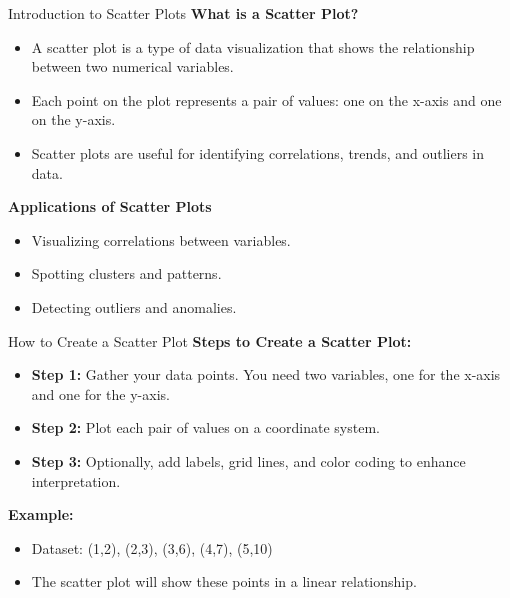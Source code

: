 \documentclass[handout]{beamer} %
\begin{document}
\begin{frame}{Introduction to Scatter Plots}
    \textbf{What is a Scatter Plot?}
    \begin{itemize}
        \item A scatter plot is a type of data visualization that shows the relationship between two numerical variables.
        \item Each point on the plot represents a pair of values: one on the x-axis and one on the y-axis.
        \item Scatter plots are useful for identifying correlations, trends, and outliers in data.
    \end{itemize}

    \textbf{Applications of Scatter Plots}
    \begin{itemize}
        \item Visualizing correlations between variables.
        \item Spotting clusters and patterns.
        \item Detecting outliers and anomalies.
    \end{itemize}
\end{frame}

\begin{frame}{How to Create a Scatter Plot}
    \textbf{Steps to Create a Scatter Plot:}
    \begin{itemize}
        \item \textbf{Step 1:} Gather your data points. You need two variables, one for the x-axis and one for the y-axis.
        \item \textbf{Step 2:} Plot each pair of values on a coordinate system.
        \item \textbf{Step 3:} Optionally, add labels, grid lines, and color coding to enhance interpretation.
    \end{itemize}

    \textbf{Example:}
    \begin{itemize}
        \item Dataset: (1,2), (2,3), (3,6), (4,7), (5,10)
        \item The scatter plot will show these points in a linear relationship.
    \end{itemize}
\end{frame}
\end{document}
